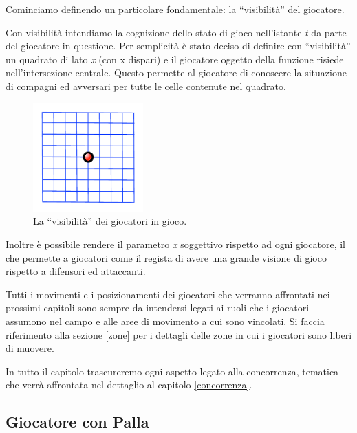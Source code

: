 \documentclass[aps,letterpaper,10pt]{article}
\begin{document}
Cominciamo definendo un particolare fondamentale: la ``visibilit\`a'' del giocatore. \vspace{3mm}

Con visibilit\`a intendiamo la cognizione dello stato di gioco nell'istante \emph{t} da parte del giocatore in questione. Per semplicit\`a \`e stato deciso di definire con ``visibilit\`a'' un quadrato di lato \emph{x} (con x dispari) e il giocatore oggetto della funzione risiede nell'intersezione centrale. Questo permette al giocatore di conoscere la situazione di compagni ed avversari per tutte le celle contenute nel quadrato. \vspace{3mm}

\begin{figure}[H]
	\begin{center}
		\includegraphics[width=160px]{images/vision.pdf}
	\end{center}
\caption{La ``visibilit\`a'' dei giocatori in gioco.}
\end{figure}

Inoltre \`e possibile rendere il parametro \emph{x} soggettivo rispetto ad ogni giocatore, il che permette a giocatori come il regista di avere una grande visione di gioco rispetto a difensori ed attaccanti. \vspace{3mm}

Tutti i movimenti e i posizionamenti dei giocatori che verranno affrontati nei prossimi capitoli sono sempre da intendersi legati ai ruoli che i giocatori assumono nel campo e alle aree di movimento a cui sono vincolati. Si faccia riferimento alla sezione \ref{zone} per i dettagli delle zone in cui i giocatori sono liberi di muovere. \vspace{3mm}

In tutto il capitolo trascureremo ogni aspetto legato alla concorrenza, tematica che verr\`a affrontata nel dettaglio al capitolo \ref{concorrenza}.

\subsection{Giocatore con Palla}
\end{document}
